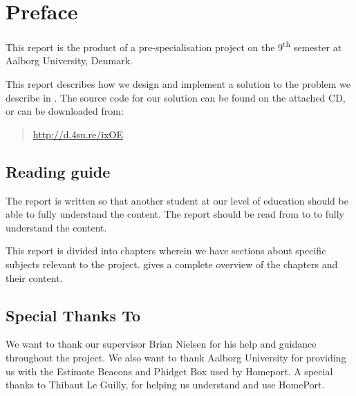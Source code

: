 \section*{Preface}\label{sec:preface}
This report is the product of a pre-specialisation project on the 9\textsuperscript{th} semester at Aalborg University, Denmark. 

This report describes how we design and implement a solution to the problem we describe in . 
The source code for our solution can be found on the attached CD, or can be downloaded from:
\begin{quote}
  \url{http://d.4su.re/ixOE}
\end{quote}

\subsection*{Reading guide}
The report is written so that another student at our level of education should be able to fully understand the content. The report should be read from  to  to fully understand the content. 

This report is divided into chapters wherein we have sections about specific subjects relevant to the project.  gives a complete overview of the chapters and their content.

\subsection*{Special Thanks To}
We want to thank our supervisor Brian Nielsen for his help and guidance throughout the project. We also want to thank Aalborg University for providing us with the Estimote Beacons and Phidget Box used by Homeport. A special thanks to Thibaut Le Guilly, for helping us understand and use HomePort. 


